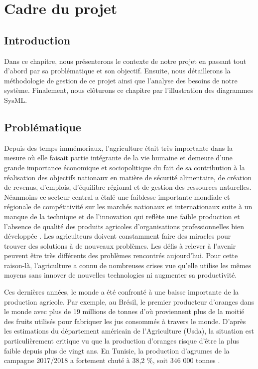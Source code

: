 

	\chapter{Cadre du projet }
	\clearpage

	
	\section{Introduction }
	Dans ce chapitre, nous présenterons le contexte de notre projet en passant tout d'abord par sa  problématique et son objectif. Ensuite, nous détaillerons la méthodologie de gestion de ce projet ainsi que l'analyse des besoins de notre système. Finalement, nous clôturons ce chapitre par l'illustration des diagrammes SysML.
	
	\section{Problématique }
	Depuis des temps immémoriaux, l'agriculture était très importante dans la mesure où elle faisait partie intégrante de la vie humaine et demeure d'une grande importance économique et sociopolitique du fait de sa contribution à la réalisation des objectifs nationaux en matière de sécurité alimentaire, de création de revenus, d'emplois, d'équilibre régional et de gestion des ressources naturelles. Néanmoins ce secteur central a étalé une faiblesse importante mondiale et régionale de compétitivité sur les marchés nationaux et internationaux suite à un manque de la technique et de l'innovation qui reflète une faible production et l'absence de qualité des produits agricoles d'organisations professionnelles bien développée . Les agriculteurs doivent constamment faire des miracles pour trouver des solutions à de nouveaux problèmes. Les défis à relever à l'avenir peuvent être très différents des problèmes rencontrés aujourd'hui. Pour cette raison-là, l'agriculture a connu de nombreuses crises vue qu'elle utilise les mêmes moyens sans innover de nouvelles technologies ni augmenter sa productivité.
	
	Ces dernières années, le monde a été confronté à une baisse importante de la production agricole. Par exemple, au Brésil, le premier producteur d'oranges dans le monde avec plus de 19 millions de tonnes d'où proviennent plus de la moitié des fruits utilisés pour fabriquer les jus consommés à travers le monde. D'après les estimations du département américain de l'Agriculture (Usda), la situation est particulièrement critique vu que la production d'oranges risque d'être la plus faible depuis plus de vingt ans. En Tunisie, la production d'agrumes de la campagne 2017/2018 a fortement chuté à 38,2 \%, soit 346 000 tonnes \cite{onagri2017/2018}.
	
